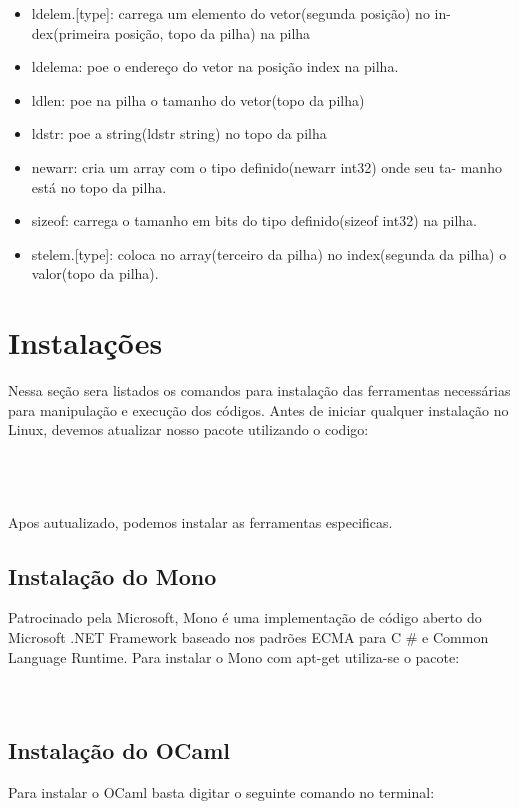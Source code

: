 \documentclass{article}
\begin{document}
\begin{itemize}
\item ldelem.[type]: carrega um elemento do vetor(segunda posição) no in-
dex(primeira posição, topo da pilha) na pilha
\item ldelema: poe o endereço do vetor na posição index na pilha.
\item ldlen: poe na pilha o tamanho do vetor(topo da pilha)
\item ldstr: poe a string(ldstr string) no topo da pilha
\item newarr: cria um array com o tipo definido(newarr int32) onde seu ta-
manho está no topo da pilha.
\item sizeof: carrega o tamanho em bits do tipo definido(sizeof int32) na
pilha.
\item stelem.[type]: coloca no array(terceiro da pilha) no index(segunda da
pilha) o valor(topo da pilha).
\end{itemize}


\section{Instalações}
Nessa seção sera listados os comandos para instalação das ferramentas necessárias para manipulação e execução dos códigos. Antes de iniciar qualquer instalação no Linux, devemos atualizar nosso pacote utilizando o codigo:\\\

\\\\
Apos autualizado, podemos instalar as ferramentas especificas.


\subsection{Instalação do Mono}
Patrocinado pela Microsoft, Mono é uma implementação de código aberto do Microsoft .NET Framework baseado nos padrões ECMA para C \# e Common Language Runtime.
Para instalar o Mono com apt-get utiliza-se o pacote:\\

\\\\


\subsection{Instalação do OCaml}
Para instalar o OCaml basta digitar o seguinte comando no terminal:\\
\end{document}
